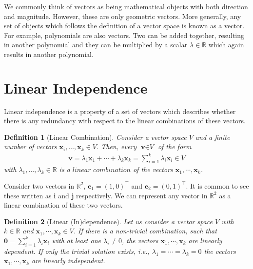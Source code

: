\documentclass[a4paper,12pt]{book}
\newcommand{\vectr}[1]{\textbf{#1}}
\newcommand{\real}{\mathbb{R}}
\newcommand{\italic}[1]{\textit{#1}}
\newtheorem{definition}{Definition}[section]
\begin{document}
	We commonly think of vectors as being mathematical objects with both direction and magnitude. However, these are only geometric vectors. More generally, any set of objects which follows the definition of a vector space is known as a vector. For example, polynomials are also vectors. Two can be added together, resulting in another polynomial and they can be multiplied by a scalar $ \lambda \in \real $ which again results in another polynomial. 
	
	
	
	\section{Linear Independence}
	Linear independence \cite{mml_linear_combinations_40} is a property of a set of vectors which describes whether there is any redundancy with respect to the linear combinations of these vectors. 
	\begin{definition}[Linear Combination]
		\normalfont	Consider a vector space $\italic{V}$ and a finite number of vectors $\vectr{x}_i,\ldots,\vectr{x}_k \in \italic{V}$. Then, every $\vectr{v} \in \italic{V}$ of the form
		\begin{align}
			\vectr{v} = \lambda_1\vectr{x}_1 + \cdots + \lambda_k\vectr{x}_k =  \sum_{i=1}^{k} \lambda_i\vectr{x}_i \in \italic{V}
		\end{align}
		with $\lambda_1,\ldots,\lambda_k \in \real$ is a $\italic{linear combination}$ of the vectors $\vectr{x}_1,\cdots,\vectr{x}_k$.
	\end{definition}
	Consider two vectors in $ \real^2 $, $\vectr{e}_1 = (1, 0)^{\top}$ and $\vectr{e}_2 = (0, 1)^{\top}$. It is common to see these written as $ \vectr{i} $ and $ \vectr{j} $ respectively. We can represent any vector in $ \real^2 $ as a linear combination of these two vectors. 
	\begin{definition}[Linear (In)dependence] 
		\normalfont Let us consider a vector space $\italic{V}$ with $k \in \real$ and  $\vectr{x}_1,\cdots,\vectr{x}_k \in \italic{V}$. If there is a non-trivial combination, such that $\vectr{0} = \sum_{i=1}^{k} \lambda_i\vectr{x}_i$ with at least one $\lambda_i \ne 0$, the vectors  $\vectr{x}_1,\cdots,\vectr{x}_k$ are \italic{linearly dependent}. If only the trivial solution exists, i.e., $ \lambda_1 = \cdots = \lambda_k = 0 $ the vectors $\vectr{x}_1,\cdots,\vectr{x}_k $ are \italic{linearly independent}.
		\label{def:linear_independence}
	\end{definition}
\end{document}
